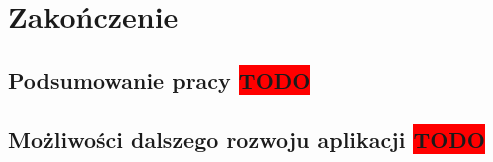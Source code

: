 
\chapter{Zakończenie}
\label{ch:zakonczenie}

\section {Podsumowanie pracy \colorbox{red}{TODO}}
\label {sec: podsumowanie-pracy}

\section {Możliwości dalszego rozwoju aplikacji \colorbox{red}{TODO}}
\label {sec: dalszy-rozwoj}

